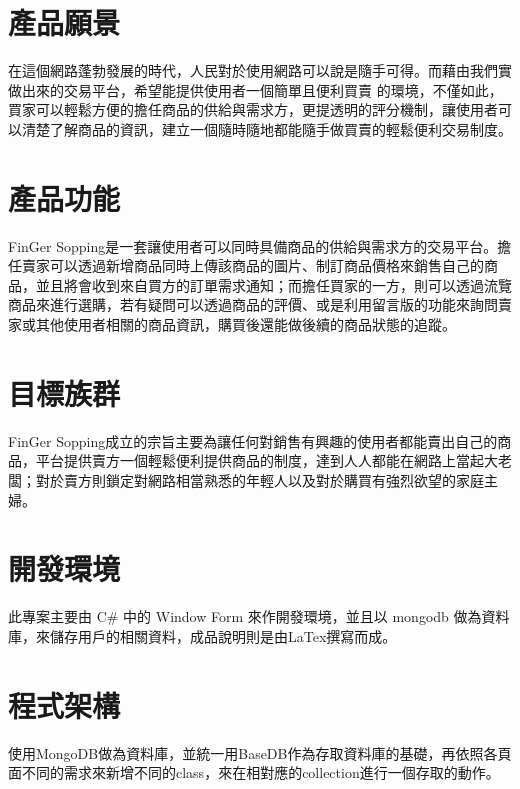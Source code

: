 \documentclass{scrreprt}
\begin{document}
\begin{CJK}{UTF8}{bkai}
\section{產品願景}
\qquad 在這個網路蓬勃發展的時代，人民對於使用網路可以說是隨手可得。而藉由我們實做出來的交易平台，希望能提供使用者一個簡單且便利買賣
的環境，不僅如此，買家可以輕鬆方便的擔任商品的供給與需求方，更提透明的評分機制，讓使用者可以清楚了解商品的資訊，建立一個隨時隨地都能隨手做買賣的輕鬆便利交易制度。

\section{產品功能}
\qquad FinGer Sopping是一套讓使用者可以同時具備商品的供給與需求方的交易平台。擔任賣家可以透過新增商品同時上傳該商品的圖片、制訂商品價格來銷售自己的商品，並且將會收到來自買方的訂單需求通知；而擔任買家的一方，則可以透過流覽商品來進行選購，若有疑問可以透過商品的評價、或是利用留言版的功能來詢問賣家或其他使用者相關的商品資訊，購買後還能做後續的商品狀態的追蹤。

\section{目標族群}
\qquad FinGer Sopping成立的宗旨主要為讓任何對銷售有興趣的使用者都能賣出自己的商品，平台提供賣方一個輕鬆便利提供商品的制度，達到人人都能在網路上當起大老闆；對於賣方則鎖定對網路相當熟悉的年輕人以及對於購買有強烈欲望的家庭主婦。

\section{開發環境}
\qquad 此專案主要由 C\# 中的 Window Form 來作開發環境，並且以 mongodb 做為資料庫，來儲存用戶的相關資料，成品說明則是由LaTex撰寫而成。

\section{程式架構}
\qquad 使用MongoDB做為資料庫，並統一用BaseDB作為存取資料庫的基礎，再依照各頁面不同的需求來新增不同的class，來在相對應的collection進行一個存取的動作。\\


\end{CJK}
\end{document}
